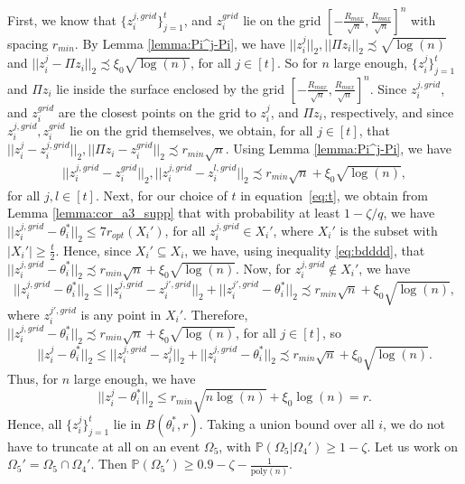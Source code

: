 \documentclass{article}
\begin{document}
First, we know that $\{z_i^{j, grid}\}_{j = 1}^t$, and $z_i^{grid}$ lie on the grid $\left[-\frac{R_{max}}{\sqrt{n}}, \frac{R_{max}}{\sqrt{n}}\right]^n$ with spacing $r_{min}$. By Lemma \ref{lemma:Pi^j-Pi}, we have $||z_i^j||_2, ||\Pi z_i||_2 \precsim \sqrt{\log(n)}$ and $||z_i^{j} - \Pi z_i||_2 \precsim \xi_0\sqrt{\log(n)}$, for all $j \in [t]$. So for $n$ large enough, $\{z_i^j\}_{j = 1}^t$ and $\Pi z_i$ lie inside the surface enclosed by the grid $\left[-\frac{R_{max}}{\sqrt{n}}, \frac{R_{max}}{\sqrt{n}}\right]^n$. Since $z_i^{j, grid}$, and $z_i^{grid}$ are the closest points on the grid to $z_i^j$, and $\Pi z_i$, respectively, and since $z_i^{j, grid}, z_i^{grid}$ lie on the grid themselves, we obtain, for all $j \in [t]$, that $||z_i^j - z_i^{j, grid}||_2, ||\Pi z_i - z_i^{grid}||_2 \precsim r_{min}\sqrt{n}$. Using Lemma \ref{lemma:Pi^j-Pi}, we have
\begin{align}
\label{eq:bdddd}
||z_i^{j, grid} - z_i^{grid}||_2, ||z_i^{j, grid} - z_i^{l, grid}||_2 \precsim r_{min}\sqrt{n} + \xi_0\sqrt{\log(n)},
\end{align}
for all $j, l \in [t]$. Next, for our choice of $t$ in equation~\eqref{eq:t}, we obtain from Lemma \ref{lemma:cor_a3_supp} that with probability at least $1 - \zeta/q$, we have $||z_i^{j, grid} - \theta_i^*||_2 \leq 7r_{opt}(X_i')$, for all $z_i^{j, grid} \in X_i'$, where $X_i'$ is the subset with $|X_i'| \geq \frac{t}{2}$. Hence, since $X_i' \subseteq X_i$, we have, using inequality \eqref{eq:bdddd}, that $||z_i^{j, grid} - \theta_i^*||_2 \precsim r_{min}\sqrt{n} + \xi_0\sqrt{\log(n)}$. Now, for $z_i^{j, grid} \notin X_i'$, we have
\begin{equation*}
||z_i^{j, grid} - \theta_i^*||_2 \leq ||z_i^{j, grid} - z_i^{j', grid}||_2 + ||z_i^{j', grid} - \theta_i^*||_2 \precsim r_{min}\sqrt{n} + \xi_0\sqrt{\log(n)},
\end{equation*}
where $z_i^{j', grid}$ is any point in $X_i'$. Therefore, $||z_i^{j, grid} - \theta_i^*||_2 \precsim r_{min}\sqrt{n} + \xi_0\sqrt{\log(n)}$, for all $j \in [t]$, so
\begin{equation*}
||z_i^{j} - \theta_i^*||_2 \leq ||z_i^{j, grid} - z_i^j||_2 + ||z_i^{j, grid} - \theta_i^*||_2 \precsim r_{min}\sqrt{n} + \xi_0\sqrt{\log(n)}.
\end{equation*}
Thus, for $n$ large enough, we have
\begin{equation*}
||z_i^{j} - \theta_i^*||_2 \leq r_{min}\sqrt{n\log(n)} + \xi_0\log(n) = r.
\end{equation*}
Hence, all $\{z_i^j\}_{j = 1}^t$ lie in $B(\theta_i^*, r)$. Taking a union bound over all $i$, we do not have to truncate at all on an event $\Omega_5$, with $\mathbb{P}(\Omega_5|\Omega_4')\geq 1 - \zeta$. Let us work on $\Omega_5' = \Omega_5 \cap \Omega_4'$. Then $\mathbb{P}(\Omega_5') \geq 0.9 - \zeta - \frac{1}{\mathrm{poly}(n)}$. 
\end{document}
